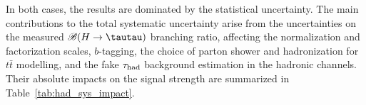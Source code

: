 In both cases, the results are dominated by the statistical uncertainty.
The main contributions to the total systematic uncertainty arise from the uncertainties on the measured $\BR(H\to \tautau)$ branching ratio,
affecting the normalization and factorization scales, $b$-tagging, the choice of parton shower and hadronization for $t\bar t$ modelling, and the fake $\tau_{\mathrm{had}}$ background estimation in the hadronic channels. Their absolute impacts on the signal strength are summarized in Table~\ref{tab:had_sys_impact}.
